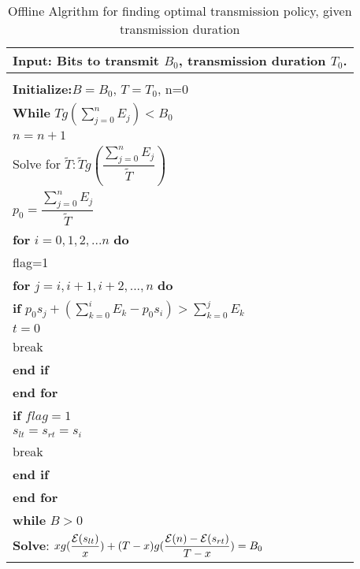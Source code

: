 \begin{table}
\begin{minipage}[b]{8cm}
\caption{Offline Algrithm for finding optimal transmission policy, given transmission duration}
\begin{tabular}{p{7cm}}
\hline \textbf{Input}: Bits to transmit $B_0$, transmission duration $T_0$.\\
\hline
\\
\textbf{Initialize:}$B = B_0$, $T = T_0$, n=0
\\
\textbf{While} $Tg(\sum_{j=0}^n E_j) < B_0$
\\
\hspace{4mm} $n = n+1$
\\
Solve for $\tilde{T}: \tilde{T}g(\dfrac{\sum_{j=0}^n E_j}{\tilde{T}})$
\\
$p_0=\dfrac{\sum_{j=0}^n E_j}{\tilde{T}}$
\\
\textbf{for} $i=0,1,2,...n$ \textbf{do}
\\
\hspace{4mm}flag=1
\\
\hspace{4mm}\textbf{for} $j=i,i+1,i+2,...,n$ \textbf{do}
\\
\hspace{7mm}\textbf{if} $p_0s_j + (\sum_{k=0}^i E_k - p_0s_i) > \sum_{k=0}^j E_k$
\\
\hspace{10mm}$t=0$
\\
\hspace{10mm}break
\\
\hspace{7mm}\textbf{end if}
\\
\hspace{4mm}\textbf{end for}
\\
\hspace{4mm}\textbf{if} $flag=1$
\\
\hspace{7mm}$s_{lt} = s_{rt} = s_i$
\\
\hspace{7mm}break
\\
\hspace{4mm}\textbf{end if}
\\
\textbf{end for}
\\
\textbf{while} $B>0$
\\
\hspace{4mm}\textbf{Solve}: $xg(\dfrac{\mathcal{E}(s_{lt})}{x})+(T-x)g(\dfrac{\mathcal{E}(n)-\mathcal{E}(s_{rt})}{T-x}) = B_0$
\\

\end{tabular}
\end{minipage}
\end{table}
